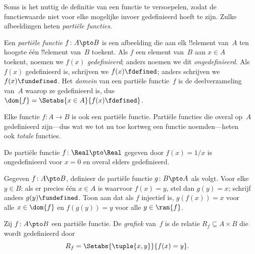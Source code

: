 \documentclass[../../../include/open-logic-section]{subfiles}
\begin{document}


\begin{explain}
Soms is het nuttig de definitie van een functie te versoepelen, zodat
de functiewaarde niet voor elke mogelijke invoer gedefinieerd hoeft te
zijn. Zulke afbeeldingen heten \emph{partiële functies}.
\end{explain}

\begin{defn}
Een \emph{partiële functie} $f \colon A \pto B$ is een afbeelding die
aan elk !!{element} van~$A$ ten hoogste één !!{element} van~$B$
toekent. Als $f$ een element van~$B$ aan $x \in A$ toekent, noemen
we $f(x)$ \emph{gedefinieerd}; anders noemen we dit
\emph{ongedefinieerd}. Als $f(x)$ gedefinieerd is, schrijven we $f(x)
\fdefined$; anders schrijven we $f(x) \fundefined$. Het
\emph{domein} van een partiële functie~$f$ is de deelverzameling
van~$A$ waarop ze gedefinieerd is, dus $\dom{f} = \Setabs{x \in
A}{f(x) \fdefined}$.
\end{defn}

\begin{ex}
Elke functie $f\colon A \to B$ is ook een partiële functie. Partiële
functies die overal op~$A$ gedefinieerd zijn---dus wat we tot nu toe
kortweg een functie noemden---heten ook \emph{totale} functies.
\end{ex}

\begin{ex}
De partiële functie $f \colon \Real \pto \Real$ gegeven door $f(x) =
1/x$ is ongedefinieerd voor $x = 0$ en overal elders gedefinieerd.
\end{ex}

\begin{prob}
Gegeven $f\colon A \pto B$, definieer de partiële functie $g\colon B
\pto A$ als volgt. Voor elke $y \in B$: als er precies één $x \in A$
is waarvoor $f(x) = y$, stel dan $g(y) = x$; schrijf anders $g(y)
\fundefined$. Toon aan dat als $f$ injectief is, $g(f(x)) = x$ voor
alle $x \in \dom{f}$ en $f(g(y)) = y$ voor alle $y \in \ran{f}$.
\end{prob}

\begin{defn}
Zij $f\colon A \pto B$ een partiële functie. De \emph{grafiek} van~$f$
is de relatie $R_f \subseteq A \times B$ die wordt gedefinieerd door
\[
R_f = \Setabs{\tuple{x,y}}{f(x) = y}.
\]
\end{defn}
\end{document}
